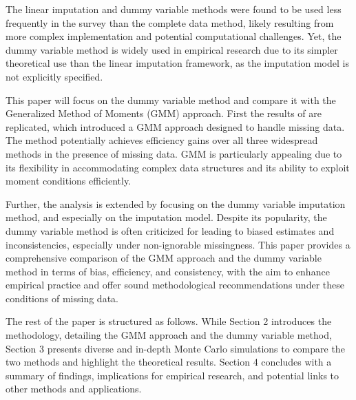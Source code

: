 The linear imputation and dummy variable methods were found to be used less frequently in the survey than the complete data method, likely resulting from more complex implementation and potential computational challenges.
Yet, the dummy variable method is widely used in empirical research due to its simpler theoretical use than the linear imputation framework, as the imputation model is not explicitly specified.

This paper will focus on the dummy variable method and compare it with the Generalized Method of Moments (GMM) approach. First the results of \citet{abrevaya2017} are replicated, which introduced a GMM approach designed to handle missing data. The method potentially achieves efficiency gains over all three widespread methods in the presence of missing data.
GMM is particularly appealing due to its flexibility in accommodating complex data structures and its ability to exploit moment conditions efficiently.

Further, the analysis is extended by focusing on the dummy variable imputation method, and especially on the imputation model.
Despite its popularity, the dummy variable method is often criticized for leading to biased estimates and inconsistencies, especially under non-ignorable missingness.
This paper provides a comprehensive comparison of the GMM approach and the dummy variable method in terms of bias, efficiency, and consistency, with the aim to enhance empirical practice and offer sound methodological recommendations under these conditions of missing data.

The rest of the paper is structured as follows.
While Section 2 introduces the methodology, detailing the GMM approach and the dummy variable method, Section 3 presents diverse and in-depth Monte Carlo simulations to compare the two methods and highlight the theoretical results.
Section 4 concludes with a summary of findings, implications for empirical research, and potential links to other methods and applications.
